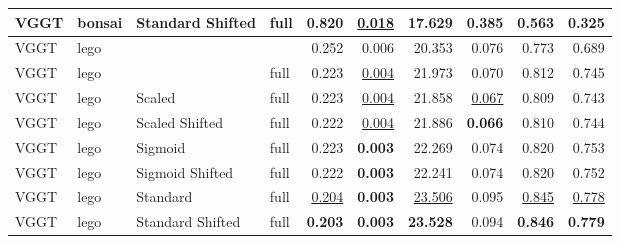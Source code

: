 \begin{table}[H]
\begin{tabular}{llllrrrrrr}
VGGT & bonsai & Standard Shifted & full & 0.820 & \underline{0.018} & \textbf{17.629} & \textbf{0.385} & \textbf{0.563} & \textbf{0.325} \\
\midrule
VGGT & lego &  &  & 0.252 & 0.006 & 20.353 & 0.076 & 0.773 & 0.689 \\
VGGT & lego &  & full & 0.223 & \underline{0.004} & 21.973 & 0.070 & 0.812 & 0.745 \\
VGGT & lego & Scaled & full & 0.223 & \underline{0.004} & 21.858 & \underline{0.067} & 0.809 & 0.743 \\
VGGT & lego & Scaled Shifted & full & 0.222 & \underline{0.004} & 21.886 & \textbf{0.066} & 0.810 & 0.744 \\
VGGT & lego & Sigmoid & full & 0.223 & \textbf{0.003} & 22.269 & 0.074 & 0.820 & 0.753 \\
VGGT & lego & Sigmoid Shifted & full & 0.222 & \textbf{0.003} & 22.241 & 0.074 & 0.820 & 0.752 \\
VGGT & lego & Standard & full & \underline{0.204} & \textbf{0.003} & \underline{23.506} & 0.095 & \underline{0.845} & \underline{0.778} \\
VGGT & lego & Standard Shifted & full & \textbf{0.203} & \textbf{0.003} & \textbf{23.528} & 0.094 & \textbf{0.846} & \textbf{0.779} \\
\bottomrule
\end{tabular}
\end{table}
